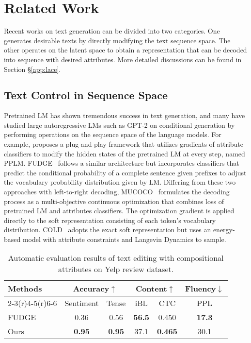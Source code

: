 \documentclass[11pt]{article}
\begin{document}
 \section{Related Work}
Recent works on text generation can be divided into two categories. One generates desirable texts by directly modifying the text sequence space. The other operates on the latent space to obtain a representation that can be decoded into sequence with desired attributes. More detailed discussions can be found in Section \S\ref{app:lace}.
\subsection{Text Control in Sequence Space}
Pretrained LM has shown tremendous success in text generation, and many have studied large autoregressive LMs such as GPT-2 on conditional generation by performing operations on the sequence space of the language models. For example, \citet{Dathathri2020Plug} proposes a plug-and-play framework that utilizes gradients of attribute classifiers to modify the hidden states of the pretrained LM at every step, named PPLM. 
FUDGE~\cite{DBLP:journals/corr/abs-2104-05218} follows a similar architecture but incorporates classifiers that predict the conditional probability of a complete sentence given prefixes to adjust the vocabulary probability distribution given by LM. Differing from these two approaches with left-to-right decoding, MUCOCO~\cite{DBLP:conf/nips/KumarMST21} formulates the decoding process as a multi-objective continuous optimization that combines loss of pretrained LM and attributes classifiers. The optimization gradient is applied directly to the soft representation consisting of each token's vocabulary distribution. COLD~\cite{QinCOLD} adopts the exact soft representation but uses an energy-based model with attribute constraints and Langevin Dynamics to sample. 
\begin{table}[t]
\setlength\tabcolsep{5.5pt}
    \scriptsize
    \centering
    \vspace{-15pt}
    \begin{tabular}{lccccc}
    \toprule
    \multirow{3}{*}{Methods} & \multicolumn{2}{c}{Accuracy$\uparrow$} & \multicolumn{2}{c}{Content$\uparrow$}  & Fluency$\downarrow$\\\cmidrule(r){2-3}\cmidrule(r){4-5}\cmidrule(r){6-6}
    & Sentiment & Tense & iBL  &  CTC &PPL   \\
    \midrule
     FUDGE & 0.36  & 0.56  & \textbf{56.5}  & 0.450 & \textbf{17.3}\\
    Ours  & \textbf{0.95}  & \textbf{0.95}  & {37.1}& \textbf{0.465} & 30.1 \\\bottomrule
    \end{tabular}
\caption{Automatic evaluation results of text editing with compositional attributes on Yelp review dataset.}
    \label{tab:tst_multiple}
    \vspace{-10pt}
\end{table}
\end{document}
